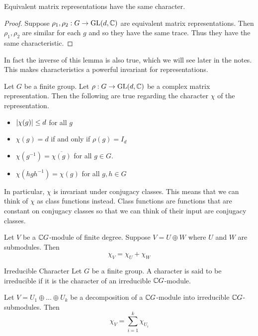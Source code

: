 \documentclass[a4paper]{article}
\begin{document}
\begin{lmm}{}{} Equivalent matrix representations have the same character. \tcbline
\begin{proof}
Suppose $\rho_1,\rho_2:G\to\operatorname{GL}(d,\mathbb{C})$ are equivalent matrix representations. Then $\rho_1,\rho_2$ are similar for each $g$ and so they have the same trace. Thus they have the same characteristic. 
\end{proof}
\end{lmm}

In fact the inverse of this lemma is also true, which we will see later in the notes. This makes characteristics a powerful invariant for representations. 

\begin{prp}{}{} Let $G$ be a finite group. Let $\rho:G\to\operatorname{GL}(d,\mathbb{C})$ be a complex matrix representation. Then the following are true regarding the character $\chi$ of the representation. 
\begin{itemize}
\item $\abs{\chi(g)}\leq d$ for all $g$
\item $\chi(g)=d$ if and only if $\rho(g)=I_d$
\item $\chi(g^{-1})=\overline{\chi(g)}$ for all $g\in G$. 
\item $\chi(hgh^{-1})=\chi(g)$ for all $g,h\in G$
\end{itemize}
\end{prp}

In particular, $\chi$ is invariant under conjugacy classes. This means that we can think of $\chi$ as class functions instead. Class functions are functions that are constant on conjugacy classes so that we can think of their input are conjugacy classes. 

\begin{lmm}{}{} Let $V$ be a $\mathbb{C} G$-module of finite degree. Suppose $V=U\oplus W$ where $U$ and $W$ are submodules. Then $$\chi_V=\chi_U+\chi_W$$
\end{lmm}

\begin{defn}{Irreducible Character}{} Let $G$ be a finite group. A character is said to be irreducible if it is the character of an irreducible $\mathbb{C} G$-module. 
\end{defn}

\begin{lmm}{}{} Let $V=U_1\oplus\dots\oplus U_k$ be a decomposition of a $\mathbb{C} G$-module into irreducible $\mathbb{C} G$-submodules. Then $$\chi_V=\sum_{i=1}^k\chi_{U_i}$$
\end{lmm}
\end{document}
